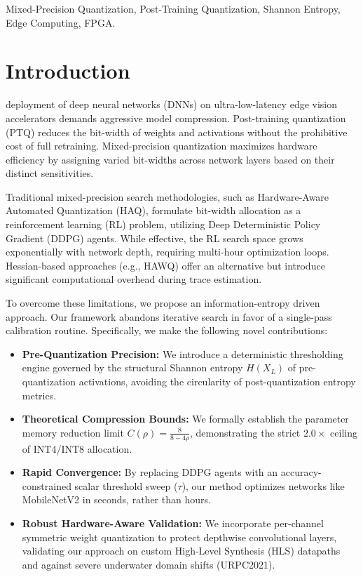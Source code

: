 \documentclass[journal]{IEEEtran}
\begin{document}
\begin{IEEEkeywords}
Mixed-Precision Quantization, Post-Training Quantization, Shannon Entropy, Edge Computing, FPGA.
\end{IEEEkeywords}

\section{Introduction}
 deployment of deep neural networks (DNNs) on ultra-low-latency edge vision accelerators demands aggressive model compression. Post-training quantization (PTQ) reduces the bit-width of weights and activations without the prohibitive cost of full retraining. Mixed-precision quantization maximizes hardware efficiency by assigning varied bit-widths across network layers based on their distinct sensitivities.

Traditional mixed-precision search methodologies, such as Hardware-Aware Automated Quantization (HAQ), formulate bit-width allocation as a reinforcement learning (RL) problem, utilizing Deep Deterministic Policy Gradient (DDPG) agents. While effective, the RL search space grows exponentially with network depth, requiring multi-hour optimization loops. Hessian-based approaches (e.g., HAWQ) offer an alternative but introduce significant computational overhead during trace estimation.

To overcome these limitations, we propose an information-entropy driven approach. Our framework abandons iterative search in favor of a single-pass calibration routine. Specifically, we make the following novel contributions:
\begin{itemize}
    \item \textbf{Pre-Quantization Precision:} We introduce a deterministic thresholding engine governed by the structural Shannon entropy $H(X_L)$ of pre-quantization activations, avoiding the circularity of post-quantization entropy metrics.
    \item \textbf{Theoretical Compression Bounds:} We formally establish the parameter memory reduction limit $C(\rho) = \frac{8}{8 - 4\rho}$, demonstrating the strict $2.0\times$ ceiling of INT4/INT8 allocation.
    \item \textbf{Rapid Convergence:} By replacing DDPG agents with an accuracy-constrained scalar threshold sweep ($\tau$), our method optimizes networks like MobileNetV2 in seconds, rather than hours.
    \item \textbf{Robust Hardware-Aware Validation:} We incorporate per-channel symmetric weight quantization to protect depthwise convolutional layers, validating our approach on custom High-Level Synthesis (HLS) datapaths and against severe underwater domain shifts (URPC2021).
\end{itemize}
\end{document}
